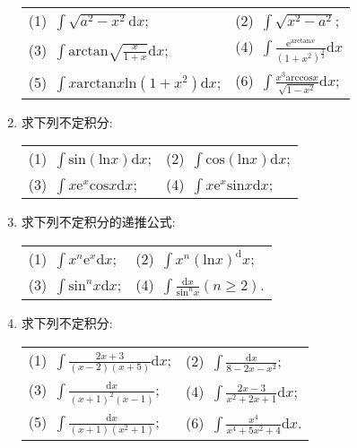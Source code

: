 \begin{enumerate}
\begin{table}[H]
	\begin{tabular}{ll}
		(1)\ $\int \sqrt{a^2-x^2}\mathrm{d}x$;\qquad \qquad \qquad \qquad &(2)\ $\int \sqrt{x^2-a^2}$;\\
		(3)\ $\int \mathrm{arctan}\sqrt{\frac{x}{1+x}}\mathrm{d}x$;\qquad \qquad \qquad \qquad &(4)\ $\int \frac{\mathrm{e}^{\mathrm{arctan}x}}{(1+x^2)^{\frac{3}{2}}}\mathrm{d}x$\\
		(5)\ $\int x\mathrm{arctan}x\mathrm{ln}(1+x^2)\mathrm{d}x$;\qquad \qquad \qquad \qquad &
		(6)\ $\int \frac{x^3\mathrm{arccos}x}{\sqrt{1-x^2}}\mathrm{d}x$;
	\end{tabular}
\end{table}
\item 求下列不定积分:
\begin{table}[H]
	\begin{tabular}{ll}
		(1)\ $\int \mathrm{sin}(\mathrm{ln}x)\mathrm{d}x$; \qquad \qquad \qquad \qquad & (2)\ $\int \mathrm{cos}(\mathrm{ln}x)\mathrm{d}x$;\\
		(3)\ $\int x\mathrm{e}^x\mathrm{cos}x\mathrm{d}x$;\qquad \qquad \qquad \qquad &(4)\ $\int x\mathrm{e}^x\mathrm{sin}x\mathrm{d}x$;
	\end{tabular}
\end{table}
\item 求下列不定积分的递推公式:\\
\begin{table}[H]
	\begin{tabular}{ll}
	(1)\ $\int x^n\mathrm{e}^x\mathrm{d}x$; \qquad \qquad \qquad \qquad &(2)\ $\int x^n(\mathrm{ln}x)^\mathrm{d}x$;\\
		(3)\ $\int \mathrm{sin}^nx\mathrm{d}x$; \qquad \qquad \qquad \qquad &(4)\ $\int \frac{\mathrm{d}x}{\mathrm{sin}^nx}(n\ge2)$.
	\end{tabular}
\end{table}
\item 	求下列不定积分:
\begin{table}[H]
	\begin{tabular}{ll}
	(1)\ $\int \frac{2x+3}{(x-2)(x+5)}\mathrm{d}x$;\qquad \qquad \qquad \qquad & (2)\ $ \int \frac{\mathrm{d}x}{8-2x-x^2}$;\\
	(3)\ $\int \frac{\mathrm{d}x}{(x+1)^2(x-1)}$;\qquad \qquad \qquad \qquad &(4)\ $\int \frac{2x-3}{x^2+2x+1}\mathrm{d}x$;\\
	(5)\ $\int \frac{\mathrm{d}x}{(x+1)(x^2+1)}$;\qquad \qquad \qquad \qquad &(6)\ $\int \frac{x^4}{x^4+5x^2+4}\mathrm{d}x$.
	\end{tabular}
\end{table}

\end{enumerate}
